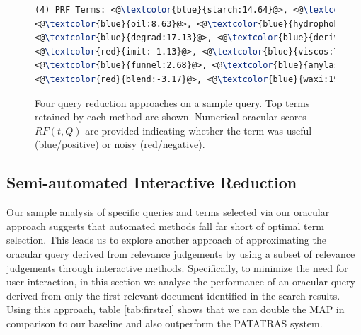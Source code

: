 \begin{figure}[htpb]
\begin{framed}
\begin{lstlisting}[basicstyle=\small\ttfamily , linewidth=\columnwidth,breaklines=true, language=TeX]
(4) PRF Terms: <@\textcolor{blue}{starch:14.64}@>, <@\textcolor{blue}{encapsul:17.50}@>, <@\textcolor{red}{chees:-4.22}@>, 
<@\textcolor{blue}{oil:8.63}@>, <@\textcolor{blue}{hydrophob:5.45}@>, <@\textcolor{blue}{agent:5.19}@>, <@\textcolor{red}{casein:-2.19}@>, 
<@\textcolor{blue}{degrad:17.13}@>, <@\textcolor{blue}{deriv:11.97}@>, <@\textcolor{blue}{tablet:5.30}@>, <@\textcolor{red}{debranch:-10.58}@>, 
<@\textcolor{red}{imit:-1.13}@>, <@\textcolor{blue}{viscos:7.77}@>, <@\textcolor{blue}{oxid:5.97}@>, <@\textcolor{blue}{activ:5.98}@>, <@\textcolor{blue}{osa:9.32}@>, 
<@\textcolor{blue}{funnel:2.68}@>, <@\textcolor{blue}{amylas:26.06}@>, <@\textcolor{red}{amylopectin:-7.14}@>, <@\textcolor{blue}{maiz:20.61}@>, 
<@\textcolor{red}{blend:-3.17}@>, <@\textcolor{blue}{waxi:19.41}@>, <@\textcolor{blue}{convert:31.81}@>, 

 \end{lstlisting} 
 \vspace*{-2ex}
\end{framed}
 \vspace*{-2ex}
  \caption{Four query reduction approaches on a sample query.  Top
    terms retained by each method are shown.  Numerical oracular
    scores $\mathit{RF}(t,Q)$ are provided indicating whether the term
    was useful (blue/positive) or noisy (red/negative).}
  \label{fig:anecdotal}  
\end{figure}
\FloatBarrier
\subsection{Semi-automated Interactive Reduction}
\label{sec:SemiAutomatedInteractiveReduction}
Our sample analysis of specific queries and terms selected via our oracular
approach suggests that automated methods fall far short of optimal term selection.
This leads us to explore another approach of approximating the oracular query
derived from relevance judgements by using a subset of relevance judgements
through interactive methods.  Specifically, to minimize the need for user interaction,
in this section we analyse the performance of an oracular query derived from
only the first relevant document identified in the search results.
Using this approach, table \ref{tab:firstrel} shows that we can double the MAP in comparison to our baseline and also outperform the PATATRAS system.

